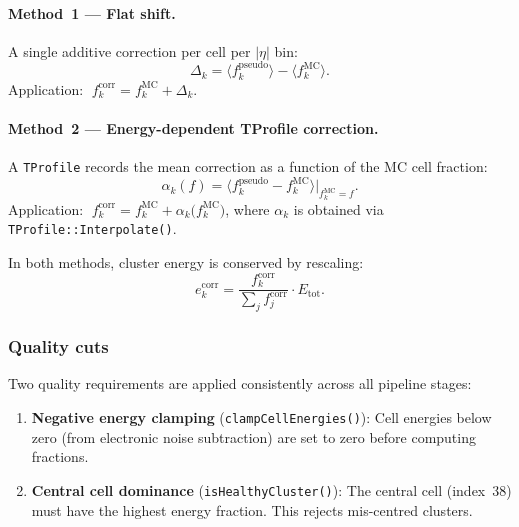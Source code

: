 \documentclass[12pt,a4paper]{article}
\begin{document}
\paragraph{Method~1 — Flat shift.}
A single additive correction per cell per $|\eta|$ bin:
\begin{equation}
  \Delta_k = \langle f_k^\text{pseudo}\rangle
            - \langle f_k^\text{MC}\rangle.
\end{equation}
Application: $\;f_k^\text{corr} = f_k^\text{MC} + \Delta_k$.

\paragraph{Method~2 — Energy-dependent TProfile correction.}
A \texttt{TProfile} records the mean correction as a function of the MC
cell fraction:
\begin{equation}
  \alpha_k(f) = \bigl\langle f_k^\text{pseudo} - f_k^\text{MC}
  \bigr\rangle\Big|_{f_k^\text{MC} = f}.
\end{equation}
Application: $\;f_k^\text{corr} = f_k^\text{MC} +
\alpha_k\!\bigl(f_k^\text{MC}\bigr)$, where $\alpha_k$ is obtained
via \texttt{TProfile::Interpolate()}.

In both methods, cluster energy is conserved by rescaling:
\begin{equation}
  e_k^\text{corr} = \frac{f_k^\text{corr}}{\sum_j f_j^\text{corr}}
  \cdot E_\text{tot}.
\end{equation}

\subsubsection{Quality cuts}
\label{sec:running:quality}

Two quality requirements are applied consistently across all pipeline
stages:

\begin{enumerate}[leftmargin=2em]
  \item \textbf{Negative energy clamping}
    (\texttt{clampCellEnergies()}): Cell energies below zero (from
    electronic noise subtraction) are set to zero before computing
    fractions.

  \item \textbf{Central cell dominance}
    (\texttt{isHealthyCluster()}): The central cell (index~38) must
    have the highest energy fraction. This rejects mis-centred clusters.
\end{enumerate}
\end{document}
